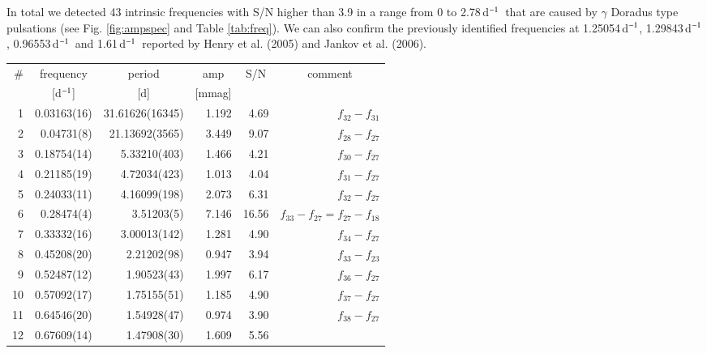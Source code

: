 \documentclass{aa}
\def\cd{d$^{\rm -1}$}
\begin{document}
In total we detected 43 intrinsic frequencies with S/N higher than 3.9 in a range from 0 to 2.78\,\cd\ that are caused by $\gamma$ Doradus type pulsations (see Fig. \ref{fig:ampspec} and Table \ref{tab:freq}). We can also confirm the previously identified frequencies at 1.25054\,\cd, 1.29843\,\cd, 0.96553\,\cd\ and 1.61\,\cd\ reported by Henry et al. (2005) and Jankov et al. (2006). 





\begin{table*}
\caption{\label{tab:freq}Pulsation frequencies, periods, amplitudes and signal-to-noise values for 43 Cyg, obtained from the BRITE data, using the iterative prewhitening procedure and sorted by increasing frequency.}
\begin{center}
\begin{tabular}{rrrrrr}
\hline
\hline
\multicolumn{1}{r}{\#} &\multicolumn{1}{c}{frequency} &\multicolumn{1}{c}{period}& \multicolumn{1}{c}{amp} & \multicolumn{1}{c}{S/N} & \multicolumn{1}{c}{comment}   \\
\multicolumn{1}{r}{ } &\multicolumn{1}{c}{[\cd]} &\multicolumn{1}{c}{[d]}& \multicolumn{1}{c}{[mmag]} & \multicolumn{1}{r}{ } & \multicolumn{1}{c}{ }   \\
\hline
1	&	0.03163(16)	&	31.61626(16345)	&	1.192	&	4.69	&	$f_{32}-f_{31}$	\\
2	&	0.04731(8)	&	21.13692(3565)	&	3.449	&	9.07	&	$f_{28}-f_{27}$	\\
3	&	0.18754(14)	&	5.33210(403)	&	1.466	&	4.21	&	$f_{30}-f_{27}$	\\
4	&	0.21185(19)	&	4.72034(423)&	1.013	&	4.04	&	$f_{31}-f_{27}$	\\
5	&	0.24033(11)	&	4.16099(198)&	2.073	&	6.31	&	$f_{32}-f_{27}$	\\
6	&	0.28474(4)	&	3.51203(5)	&	7.146	&	16.56	&	$f_{33}-f_{27} = f_{27}-f_{18}$	\\
7	&	0.33332(16)	&	3.00013(142)&	1.281	&	4.90	&	$f_{34}-f_{27}$	\\
8	&	0.45208(20)	&	2.21202(98)	&	0.947	&	3.94	&	$f_{33}-f_{23}$	\\
9	&	0.52487(12)	&	1.90523(43)	&	1.997	&	6.17	&	$f_{36}-f_{27}$	\\
10	&	0.57092(17)	&	1.75155(51)	&	1.185	&	4.90	&	$f_{37}-f_{27}$	\\
11	&	0.64546(20)	&	1.54928(47)	&	0.974	&	3.90	&	$f_{38}-f_{27}$	\\
12	&	0.67609(14)	&	1.47908(30)	&	1.609	&	5.56	&		\\

\end{tabular}
\end{center}
\end{table*}
\end{document}
